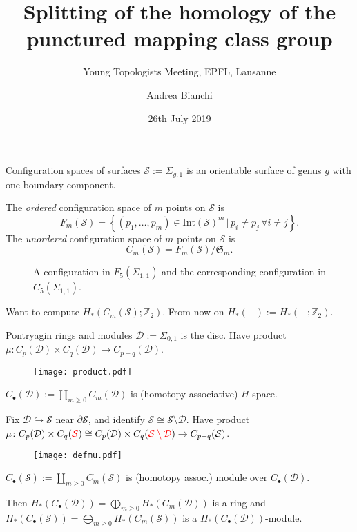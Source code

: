 \documentclass[10pt]{beamer}
\title[Splitting of homology of mapping class group]{Splitting of the homology of the punctured mapping class group}
\subtitle{Young Topologists Meeting, EPFL, Lausanne}
\author{Andrea Bianchi}
\date{26th July 2019}
\institute[Universit\"{a}t Bonn]{Mathematisches Institut, Universit\"{a}t Bonn}
\newcommand{\Z}{\mathbb{Z}}
\newcommand{\fS}{\mathfrak{S}}
\newcommand{\D}{\mathcal{D}}
\renewcommand{\S}{\mathcal{S}}
\newcommand{\sg}{\Sigma_{g,1}}
\newcommand{\Cb}{C_{\bullet}}
\newcommand{\set}[1]{\left\{#1\right\}}
\begin{document}
\maketitle

\begin{frame}{Configuration spaces of surfaces}
$\S:=\sg$ is an orientable surface of genus $g$ with one boundary
component.

\pause
The \emph{ordered} configuration space of $m$ points on $\S$ is
\[
 F_m(\S)=\set{(p_1,\dots,p_m)\in \mathrm{Int}(\S)^m \, | \, p_i\neq p_j \,\forall i\neq j}.
\]
\pause
The \emph{unordered} configuration space of $m$ points on $\S$ is
\[
 C_m(\S)=F_m(\S)/\fS_m.
\]
\pause
\vspace{-0.5cm}
\begin{figure}[h]
\hspace{1cm}
\caption{A configuration in $F_5(\Sigma_{1,1})$ and the corresponding configuration in $C_5(\Sigma_{1,1})$.}
\end{figure}
\pause
\vspace{-0.5cm}
Want to compute $H_*(C_m(\S);\Z_2)$. From now on $H_*(-):=H_*(-;\Z_2)$. 
\end{frame}

\begin{frame}{Pontryagin rings and modules}
$\D:=\Sigma_{0,1}$ is the disc. Have product
$\mu\colon C_p(\D)\times C_q(\D)\to C_{p+q}(\D)$.
\begin{figure}[h]
\texttt{[image: product.pdf]}
\end{figure}
\vspace{-0.3cm}
$\Cb(\D):=\coprod_{m\geq 0}C_m(\D)$ is (homotopy associative) $H$-space.
\pause

\vspace{0.1cm}
Fix $\D\hookrightarrow\S$ near $\partial\S$, and identify $\S\cong\S\setminus\D$. Have product
$\mu\colon C_p(\D)\times C_q(\textcolor{red}{\S})\cong C_p(\D)\times C_q(\textcolor{red}{\S\setminus\D})\to C_{p+q}(\S)$.
\begin{figure}[h]
\texttt{[image: defmu.pdf]}
\end{figure}
\vspace{-0.3cm}
$\Cb(\S):=\coprod_{m\geq 0} C_m(\S)$ is (homotopy assoc.) module over $\Cb(\D)$.

\pause
\vspace{0.1cm}
Then $H_*(\Cb(\D))=\bigoplus_{m\geq 0}H_*(C_m(\D))$ is a ring and $H_*(\Cb(\S))=\bigoplus_{m\geq 0}H_*(C_m(\S))$
is a $H_*(\Cb(\D))$-module.
\end{frame}
\end{document}
